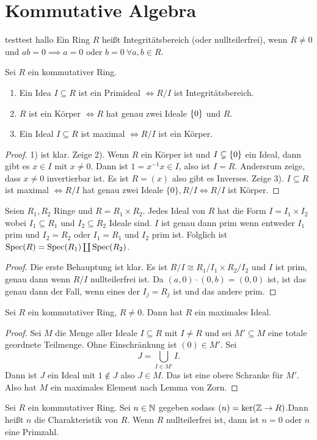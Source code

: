 \section{Kommutative Algebra}

\begin{Def}
testtest hallo
    Ein Ring $R$ heißt Integritätsbereich (oder nullteilerfrei), wenn $R\neq 0$ und $ab=0\implies a=0 \text{ oder } b=0 \ \forall a,b\in R.$
\end{Def}
\begin{Lemma} Sei $R$ ein kommutativer Ring.
\begin{enumerate}
    \item Ein Idea $I\subseteq R$ ist ein Primideal $\iff R/I$ ist Integritätsbereich.
    \item $R$ ist ein Körper $\iff R$ hat genau zwei Ideale $\{0\}$ und $R$.
    \item Ein Ideal $I\subseteq R$ ist maximal $\iff R/I$ ist ein Körper.
\end{enumerate}
\begin{proof}
    1) ist klar.
    Zeige 2). Wenn $R$ ein Körper ist und $I\subsetneq \{0\}$ ein Ideal, dann gibt es $x\in I$ mit $x\neq 0$. Dann ist $1=x^{-1}x\in I$, also ist $I=R$. Andersrum zeige, dass $x\neq 0$ invertierbar ist. Es ist $R=(x)$ also gibt es Inverses.
    Zeige 3). $I\subseteq R$ ist maximal $\iff R/I$ hat genau zwei Ideale $\{0\}, R/I \iff R/I$ ist Körper.
\end{proof}
\begin{Lemma}\label{Lem:IdealeProduktring}
    Seien $R_1,R_2$ Ringe und $R=R_1\times R_2$. Jedes Ideal von $R$ hat die Form $I=I_1\times I_2$ wobei $I_1\subseteq R_1$ und $I_2\subseteq R_2$ Ideale sind. $I$ ist genau dann prim wenn entweder $I_1$ prim und $I_2=R_2$ oder $I_1=R_1$ und $I_2$ prim ist.
    Folglich ist $\operatorname{Spec}(R)=\operatorname{Spec}(R_1)\coprod \operatorname{Spec}(R_2)$.
\end{Lemma}
\begin{proof}
    Die erste Behauptung ist klar. Es ist $R/I\cong R_1/I_1\times R_2/I_2$ und $I$ ist prim, genau dann wenn $R/I$ nullteilerfrei ist.
    Da $(a,0)\cdot (0,b)=(0,0)$ ist, ist das genau dann der Fall, wenn eines der $I_j=R_j$ ist und das andere prim.
\end{proof}

\begin{Satz}\label{Satz:ExMaxId}
    Sei $R$ ein kommutativer Ring, $R\neq 0$. Dann hat $R$ ein maximales Ideal.
\end{Satz}
\begin{proof}
    Sei $M$ die Menge aller Ideale $I\subseteq R$ mit $I\neq R$ und sei $M'\subseteq M$ eine totale geordnete Teilmenge.  Ohne Einschränkung ist $(0)\in M'$. Sei $$J=\bigcup\limits_{I\in M'}I.$$ Dann ist $J$ ein Ideal mit $1\not\in J$ also $J\in M$. Das ist eine obere Schranke für $M'$. Also hat $M$ ein maximales Element nach Lemma von Zorn.
\end{proof}
\end{Lemma}
\begin{Def}
    Sei $R$ ein kommutativer Ring. Sei $n\in \mathbb{N}$ gegeben sodass $(n)=\ker(\mathbb{Z}\to R)$.Dann heißt $n$ die Charakteristik von $R$. Wenn $R$ nullteilerfrei ist, dann ist $n=0$ oder $n$ eine Primzahl.
\end{Def}
